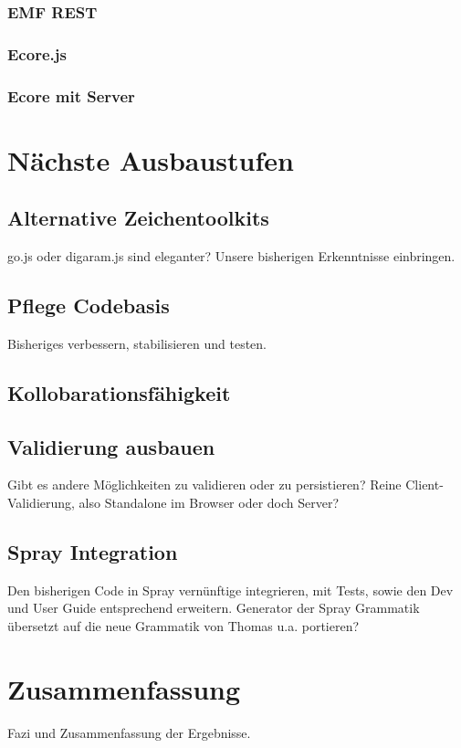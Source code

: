 \subsubsection{EMF REST}

\subsubsection{Ecore.js}

\subsubsection{Ecore mit Server}


\section{Nächste Ausbaustufen}

\subsection{Alternative Zeichentoolkits}

go.js oder digaram.js sind eleganter?
Unsere bisherigen Erkenntnisse einbringen.

\subsection{Pflege Codebasis}

Bisheriges verbessern, stabilisieren und testen.

\subsection{Kollobarationsfähigkeit}

\subsection{Validierung ausbauen}

Gibt es andere Möglichkeiten zu validieren oder zu persistieren?
Reine Client-Validierung, also Standalone im Browser oder doch Server?

\subsection{Spray Integration}

Den bisherigen Code in Spray vernünftige integrieren, mit Tests, sowie
den Dev und User Guide entsprechend erweitern.
Generator der Spray Grammatik übersetzt auf die neue Grammatik von Thomas u.a.
portieren?


\section{Zusammenfassung}

Fazi und Zusammenfassung der Ergebnisse.

